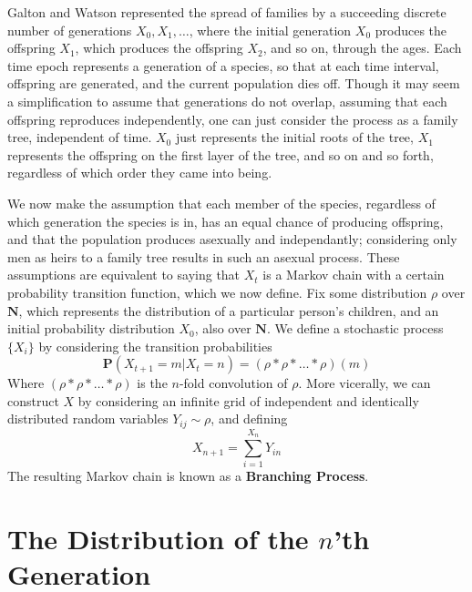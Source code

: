 Galton and Watson represented the spread of families by a succeeding discrete number of generations $X_0, X_1, \dots$, where the initial generation $X_0$ produces the offspring $X_1$, which produces the offspring $X_2$, and so on, through the ages. Each time epoch represents a generation of a species, so that at each time interval, offspring are generated, and the current population dies off. Though it may seem a simplification to assume that generations do not overlap, assuming that each offspring reproduces independently, one can just consider the process as a family tree, independent of time. $X_0$ just represents the initial roots of the tree, $X_1$ represents the offspring on the first layer of the tree, and so on and so forth, regardless of which order they came into being.

We now make the assumption that each member of the species, regardless of which generation the species is in, has an equal chance of producing offspring, and that the population produces asexually and independantly; considering only men as heirs to a family tree results in such an asexual process. These assumptions are equivalent to saying that $X_t$ is a Markov chain with a certain probability transition function, which we now define. Fix some distribution $\rho$ over $\mathbf{N}$, which represents the distribution of a particular person's children, and an initial probability distribution $X_0$, also over $\mathbf{N}$. We define a stochastic process $\{ X_i \}$ by considering the transition probabilities
%
\[ \mathbf{P}(X_{t+1} = m | X_t = n) = (\rho * \rho * \dots * \rho)(m) \]
%
Where $(\rho * \rho * \dots * \rho)$ is the $n$-fold convolution of $\rho$. More vicerally, we can construct $X$ by considering an infinite grid of independent and identically distributed random variables $Y_{ij} \sim \rho$, and defining
%
\[ X_{n+1} = \sum_{i = 1}^{X_n} Y_{in} \]
%
The resulting Markov chain is known as a {\bf Branching Process}.

\section{The Distribution of the $n$'th Generation}

